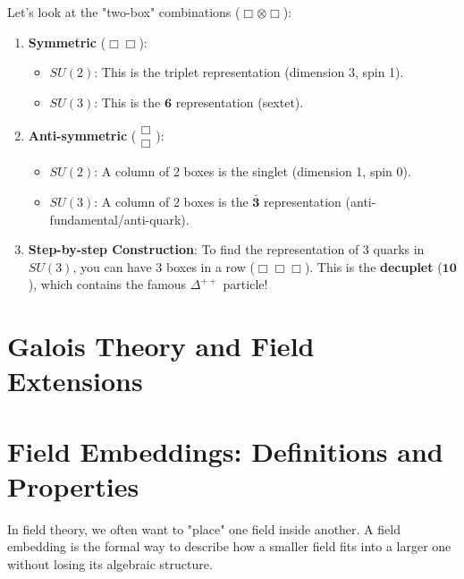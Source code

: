\begin{example}
Let's look at the "two-box" combinations ($\Box \otimes \Box$):
\begin{enumerate}
    \item \textbf{Symmetric} ($\Box\Box$):
    \begin{itemize}
        \item \textbf{$SU(2)$}: This is the triplet representation (dimension 3, spin 1).
        \item \textbf{$SU(3)$}: This is the $\mathbf{6}$ representation (sextet).
    \end{itemize}
    \item \textbf{Anti-symmetric} ($\begin{matrix} \Box \\ \Box \end{matrix}$):
    \begin{itemize}
        \item \textbf{$SU(2)$}: A column of 2 boxes is the singlet (dimension 1, spin 0).
        \item \textbf{$SU(3)$}: A column of 2 boxes is the $\bar{\mathbf{3}}$ representation (anti-fundamental/anti-quark).
    \end{itemize}
    \item \textbf{Step-by-step Construction}: To find the representation of 3 quarks in $SU(3)$, you can have 3 boxes in a row ($\Box\Box\Box$). This is the \textbf{decuplet} ($\mathbf{10}$), which contains the famous $\Delta^{++}$ particle!
\end{enumerate}
\end{example}

\section{Galois Theory and Field Extensions}

\section{Field Embeddings: Definitions and Properties}

In field theory, we often want to "place" one field inside another. A field embedding is the formal way to describe how a smaller field fits into a larger one without losing its algebraic structure.

